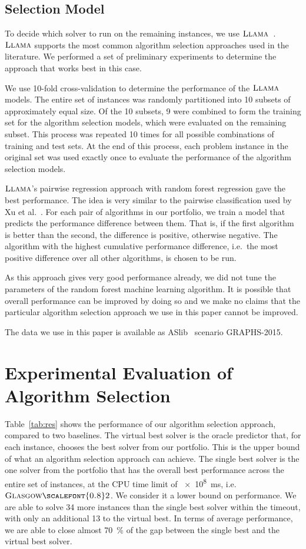 \documentclass{llncs}
\newcommand{\GlasgowTwo}{$\textsc{Glasgow{\scalefont{0.8}2}}$\xspace}
\newcommand{\LLAMA}{$\textsc{Llama}$\xspace}
\begin{document}
\subsection{Selection Model}

To decide which solver to run on the remaining instances, we use \LLAMA~\cite{kotthoff_llama_2013}.
\LLAMA supports the most common algorithm selection approaches used in the literature. We performed a
set of preliminary experiments to determine the approach that works best in this case.

We use 10-fold cross-validation to determine the performance of the \LLAMA models. The entire set of
instances was randomly partitioned into 10 subsets of approximately equal size. Of the 10 subsets, 9
were combined to form the training set for the algorithm selection models, which were evaluated on
the remaining subset. This process was repeated 10 times for all possible combinations of training
and test sets. At the end of this process, each problem instance in the original set was used
exactly once to evaluate the performance of the algorithm selection models.

\LLAMA's pairwise regression approach with random forest regression gave the best performance. The
idea is very similar to the pairwise classification used by Xu et al.\ \cite{xu_satzilla_2008}. For
each pair of algorithms in our portfolio, we train a model that predicts the performance difference
between them. That is, if the first algorithm is better than the second, the difference is positive,
otherwise negative. The algorithm with the highest cumulative performance difference, i.e.\ the most
positive difference over all other algorithms, is chosen to be run.

As this approach gives very good performance already, we did not tune the parameters of the random
forest machine learning algorithm. It is possible that overall performance can be improved by doing
so and we make no claims that the particular algorithm selection approach we use in this paper
cannot be improved.

The data we use in this paper is available as ASlib~\cite{aslib} scenario GRAPHS-2015.

\section{Experimental Evaluation of Algorithm Selection}

Table~\ref{tab:res} shows the performance of our algorithm selection approach, compared to two
baselines. The virtual best solver is the oracle predictor that, for each instance, chooses the best
solver from our portfolio. This is the upper bound of what an algorithm selection approach can
achieve. The single best solver is the one solver from the portfolio that has the overall best
performance across the entire set of instances, at the CPU time limit of \SI{e8}{\ms},
i.e.\ \GlasgowTwo. We consider it a lower bound on performance.
We are able to solve 34 more instances than the single best solver within the timeout, with only an
additional 13 to the virtual best. In terms of average performance, we are able to close almost
\SI{70}{\percent} of the gap between the single best and the virtual best solver.
\end{document}
